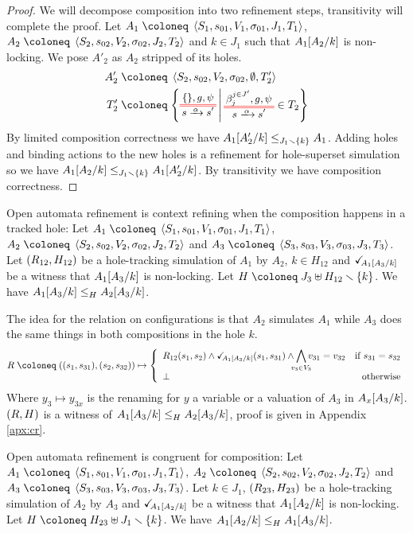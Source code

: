 \documentclass{article}
\begin{document}
\begin{proof}
We will decompose composition into two refinement steps, transitivity will complete the proof.
Let \(A_1 \defobject \OAg[1]\), \(A_2 \defobject \OAg[2]\) and \(k \in J_1\) such that \(A_1\subst{A_2}{k}\) is non-locking.
We pose \(A'_2\) as \(A_2\) stripped of its holes.
\begin{align*}
	A'_2 \defobject & \OA{S_2}{s_{02}}{V_2}{\sigma_{02}}{\emptyset}{T'_2} \\
	T'_2 \defobject & \mset{\OT{s}{s'}{\alpha}{\mbrc{}}{g}{\psi}}{\OTg \in T_2}
\end{align*}
By limited composition correctness we have \(\wrel{A_1\subst{A'_2}{k}}{A_1}{J_1 \setminus \mbrc{k}}\).
Adding holes and binding actions to the new holes is a refinement for hole-superset simulation so we have \(\wrel{A_1\subst{A_2}{k}}{A_1\subst{A'_2}{k}}{J_1 \setminus \mbrc{k}}\).
By transitivity we have composition correctness.
\end{proof}
\begin{thm}
Open automata refinement is context refining when the composition happens in a tracked hole:
Let \(A_1 \defobject \OAg[1]\), \(A_2 \defobject \OAg[2]\) and \(A_3 \defobject \OAg[3]\).
Let \(\mpar{R_{12}, H_{12}}\) be a hole-tracking simulation of \(A_1\) by \(A_2\), \(k \in H_{12}\) and \(\reach{A_1\subst{A_3}{k}}\) be a witness that \(A_1\subst{A_3}{k}\) is non-locking.
Let \(H \defobject J_3 \uplus H_{12} \setminus \mbrc{k}\).
We have \(\wrel{A_1\subst{A_3}{k}}{A_2\subst{A_3}{k}}{H}\).
\end{thm}
\begin{proofsketch}
The idea for the relation on configurations is that \(A_2\) simulates \(A_1\) while \(A_3\) does the same things in both compositions in the hole \(k\).
\[ R \defobject \mpar{\mpar{s_1, s_{31}}, \mpar{s_2, s_{32}}} \mapsto \choice{R_{12}\mpar{s_1, s_2} \wedge \reach{A_1\subst{A_3}{k}}\mpar{s_1, s_{31}} \wedge \bigwedge_\subbox{v_3 \in V_3} v_{31} = v_{32} & \text{if } s_{31} = s_{32} \\ \bot & \text{otherwise}} \]
Where \(y_3 \mapsto y_{3x}\) is the renaming for \(y\) a variable or a valuation of \(A_3\) in \(A_x\subst{A_3}{k}\).
\(\mpar{R, H}\) is a witness of \(\wrel{A_1\subst{A_3}{k}}{A_2\subst{A_3}{k}}{H}\), proof is given in Appendix \ref{apx:cr}.
\end{proofsketch}
\begin{thm}
Open automata refinement is congruent for composition:
Let \(A_1 \defobject \OAg[1]\), \(A_2 \defobject \OAg[2]\) and \(A_3 \defobject \OAg[3]\).
Let \(k \in J_1\), \(\mpar{R_{23}, H_{23}}\) be a hole-tracking simulation of \(A_2\) by \(A_3\) and \(\reach{A_1\subst{A_2}{k}}\) be a witness that \(A_1\subst{A_2}{k}\) is non-locking.
Let \(H \defobject H_{23} \uplus J_1 \setminus \mbrc{k}\).
We have \(\wrel{A_1\subst{A_2}{k}}{A_1\subst{A_3}{k}}{H}\).
\end{thm}
\end{document}
